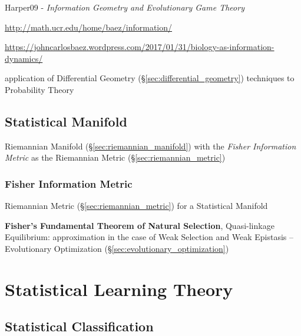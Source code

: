 Harper09 - \emph{Information Geometry and Evolutionary Game Theory}

\url{http://math.ucr.edu/home/baez/information/}

\url{https://johncarlosbaez.wordpress.com/2017/01/31/biology-as-information-dynamics/}

application of Differential Geometry
(\S\ref{sec:differential_geometry}) techniques to Probability Theory



\subsection{Statistical Manifold}\label{sec:statistical_manifold}

Riemannian Manifold (\S\ref{sec:riemannian_manifold}) with the
\emph{Fisher Information Metric} as the Riemannian Metric
(\S\ref{sec:riemannian_metric})



\subsubsection{Fisher Information Metric}
\label{sec:fisher_information}

Riemannian Metric (\S\ref{sec:riemannian_metric}) for a Statistical
Manifold

\fist \textbf{Fisher's Fundamental Theorem of Natural Selection},
Quasi-linkage Equilibrium: approximation in the case of Weak Selection
and Weak Epistasis -- Evolutionary Optimization
(\S\ref{sec:evolutionary_optimization}) %



\section{Statistical Learning Theory}\label{sec:statistical_learning_theory}




\subsection{Statistical Classification}\label{sec:statistical_classification}



